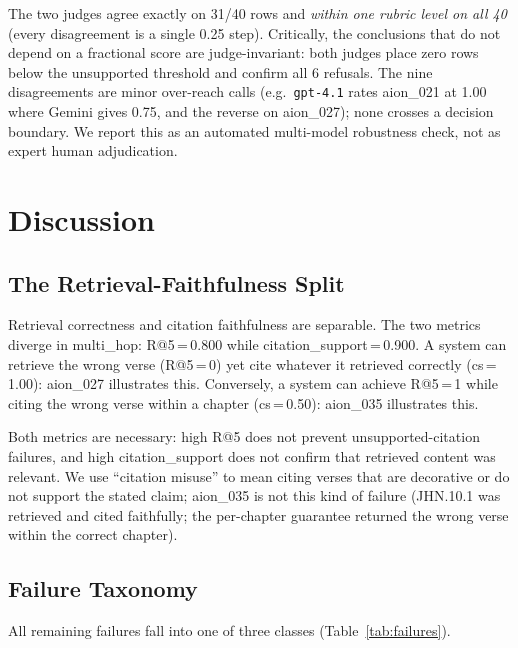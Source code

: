 \documentclass[11pt]{article}
\begin{document}
The two judges agree exactly on 31/40 rows and \emph{within one rubric level on all 40} (every disagreement is a single 0.25 step). Critically, the conclusions that do not depend on a fractional score are judge-invariant: both judges place zero rows below the unsupported threshold and confirm all 6 refusals. The nine disagreements are minor over-reach calls (e.g.\ \texttt{gpt-4.1} rates aion\_021 at 1.00 where Gemini gives 0.75, and the reverse on aion\_027); none crosses a decision boundary. We report this as an automated multi-model robustness check, not as expert human adjudication.

\section{Discussion}

\subsection{The Retrieval-Faithfulness Split}

Retrieval correctness and citation faithfulness are separable.
The two metrics diverge in multi\_hop: R@5\,=\,0.800 while citation\_support\,=\,0.900.
A system can retrieve the wrong verse (R@5\,=\,0) yet cite whatever it retrieved correctly (cs\,=\,1.00): aion\_027 illustrates this.
Conversely, a system can achieve R@5\,=\,1 while citing the wrong verse within a chapter (cs\,=\,0.50): aion\_035 illustrates this.

Both metrics are necessary: high R@5 does not prevent unsupported-citation failures, and high citation\_support does not confirm that retrieved content was relevant. We use ``citation misuse'' to mean citing verses that are decorative or do not support the stated claim; aion\_035 is not this kind of failure (JHN.10.1 was retrieved and cited faithfully; the per-chapter guarantee returned the wrong verse within the correct chapter).

\subsection{Failure Taxonomy}

All remaining failures fall into one of three classes (Table~\ref{tab:failures}).
\end{document}
